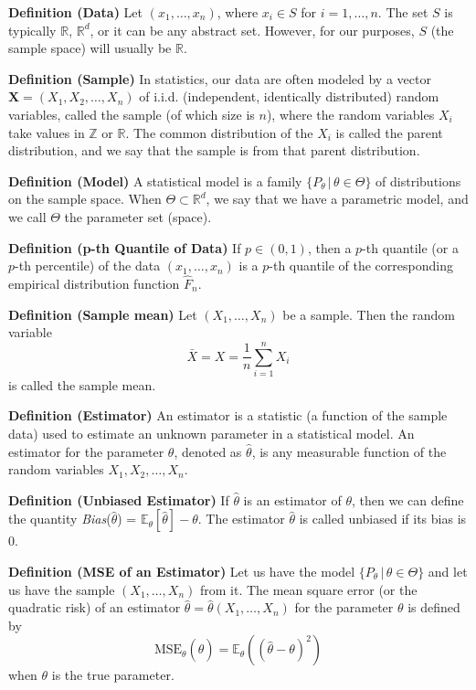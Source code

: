 \documentclass[12pt,a4paper,oneside]{book} %
\begin{document}
\textbf{Definition (Data)} Let $(x_1, \ldots, x_n)$, where $x_i \in S$ for $i = 1, \ldots, n$. The set $S$ is typically $\mathbb{R}$, $\mathbb{R}^d$, or it can be any abstract set. However, for our purposes, $S$ (the sample space) will usually be $\mathbb{R}$.

\textbf{Definition (Sample)} In statistics, our data are often modeled by a vector $\mathbf{X} = (X_1, X_2, \ldots, X_n)$ of i.i.d. (independent, identically distributed) random variables, called the sample (of which size is $n$), where the random variables $X_i$ take values in $\mathbb{Z}$ or $\mathbb{R}$. The common distribution of the $X_i$ is called the parent distribution, and we say that the sample is from that parent distribution.

\textbf{Definition (Model)} A statistical model is a family $\{P_{\theta} \,|\, \theta \in \Theta\}$ of distributions on the sample space. When $\Theta \subset \mathbb{R}^d$, we say that we have a parametric model, and we call $\Theta$ the parameter set (space).

\textbf{Definition (p-th Quantile of Data)} If $p \in (0, 1)$, then a $p$-th quantile (or a $p$-th percentile) of the data $(x_1, \ldots, x_n)$ is a $p$-th quantile of the corresponding empirical distribution function $\hat{F}_n$.

\textbf{Definition (Sample mean)} Let $(X_1, \ldots, X_n)$ be a sample. Then the random variable
\[ \bar{X} = X = \frac{1}{n} \sum_{i=1}^{n} X_i \]
is called the sample mean.

\textbf{Definition (Estimator)} An estimator is a statistic (a function of the sample data) used to estimate an unknown parameter in a statistical model. An estimator for the parameter $\theta$, denoted as $\hat{\theta}$, is any measurable function of the random variables $X_1, X_2, \ldots, X_n$.

\textbf{Definition (Unbiased Estimator)} If $\hat{\theta}$ is an estimator of $\theta$, then we can define the quantity \textit{Bias}($\hat{\theta}$) = $\mathbb{E}_{\theta}[\hat{\theta}] - \theta$. The estimator $\hat{\theta}$ is called unbiased if its bias is 0.

\textbf{Definition (MSE of an Estimator)} Let us have the model $\{P_{\theta} \,|\, \theta \in \Theta\}$ and let us have the sample $(X_1, \ldots, X_n)$ from it. The mean square error (or the quadratic risk) of an estimator $\hat{\theta} = \hat{\theta}(X_1, \ldots, X_n)$ for the parameter $\theta$ is defined by
\[ \text{MSE}_{\theta}(\hat{\theta}) = \mathbb{E}_{\theta}((\hat{\theta} - \theta)^2) \]
when $\theta$ is the true parameter.
\end{document}
